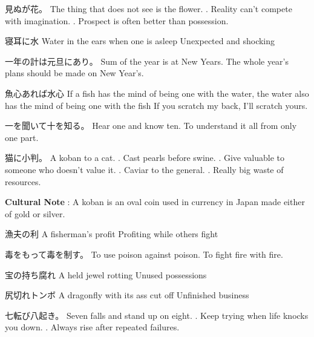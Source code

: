 \par{見ぬが花。 \hfill\break
The thing that does not see is the flower. \hfill{}. Reality can't compete with imagination. \hfill{}. Prospect is often better than possession. }

\par{寝耳に水 \hfill\break
Water in the ears when one is asleep \hfill\break
Unexpected and shocking }

\par{一年の計は元旦にあり。 \hfill\break
Sum of the year is at New Year\textquotesingle s. \hfill\break
The whole year's plans should be made on New Year's. }

\par{魚心あれば水心 \hfill\break
If a fish has the mind of being one with the water, the water also has the mind of being one with the fish \hfill\break
If you scratch my back, I'll scratch yours. }

\par{一を聞いて十を知る。 \hfill\break
Hear one and know ten. \hfill\break
To understand it all from only one part. }

\par{猫に小判。 \hfill\break
A koban to a cat. \hfill{}. Cast pearls before swine. \hfill{}. Give valuable to someone who doesn't value it. \hfill{}. Caviar to the general. \hfill{}. Really big waste of resources. }

\par{\textbf{Cultural Note }: A koban is an oval coin used in currency in Japan made either of gold or silver. }

\par{漁夫の利 \hfill\break
A fisherman's profit \hfill\break
Profiting while others fight }

\par{毒をもって毒を制す。 \hfill\break
To use poison against poison. \hfill\break
To fight fire with fire. }

\par{宝の持ち腐れ \hfill\break
A held jewel rotting \hfill\break
Unused possessions }

\par{尻切れトンボ \hfill\break
A dragonfly with its ass cut off \hfill\break
Unfinished business }

\par{七転び八起き。 \hfill\break
Seven falls and stand up on eight. \hfill{}. Keep trying when life knocks you down. \hfill{}. Always rise after repeated failures. }

